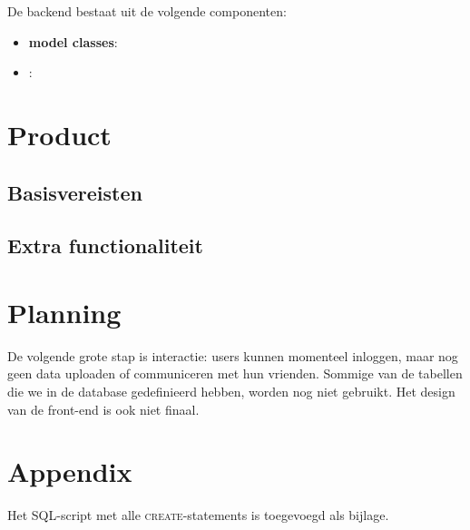 \documentclass[12pt,a4paper]{article}
\begin{document}
De backend bestaat uit de volgende componenten:

\begin{itemize}

\item \textbf{model classes}:  

\item \textbf{}:

\end{itemize}

\section{Product}

\subsection{Basisvereisten}

\subsection{Extra functionaliteit}

\section{Planning}
De volgende grote stap is interactie: users kunnen momenteel inloggen, maar nog
geen data uploaden of communiceren met hun vrienden. Sommige van de tabellen 
die we in de database gedefinieerd hebben, worden nog niet gebruikt. Het design 
van de front-end is ook niet finaal.

\section{Appendix}
Het SQL-script met alle \textsc{create}-statements is toegevoegd als bijlage.
\end{document}
